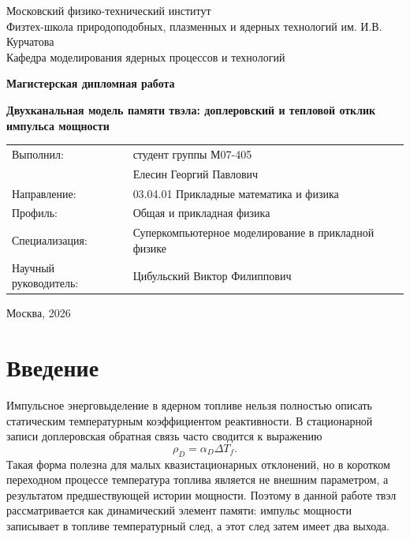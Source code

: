 \documentclass[12pt]{article}
\begin{document}
\begin{titlepage}
    \centering
    {\large Московский физико-технический институт\\[0.3cm]
    Физтех-школа природоподобных, плазменных и ядерных технологий им. И.В. Курчатова\\[0.3cm]
    Кафедра моделирования ядерных процессов и технологий\par}

    \vspace{2.5cm}

    {\Large\bfseries Магистерская дипломная работа\par}

    \vspace{1.5cm}

    {\LARGE\bfseries Двухканальная модель памяти твэла: доплеровский и тепловой отклик импульса мощности\par}

    \vspace{2.5cm}

    \begin{flushright}
        \begin{tabular}{>{\raggedleft\arraybackslash}p{5cm}p{7cm}}
            Выполнил: & студент группы М07-405\\
            & Елесин Георгий Павлович\\[0.4cm]
            Направление: & 03.04.01 Прикладные математика и физика\\[0.4cm]
            Профиль: & Общая и прикладная физика\\[0.4cm]
            Специализация: & Суперкомпьютерное моделирование в прикладной физике\\[0.4cm]
            Научный руководитель: & Цибульский Виктор Филиппович\\
        \end{tabular}
    \end{flushright}

    \vfill

    {Москва, 2026}
\end{titlepage}

\tableofcontents
\newpage

\section{Введение}

Импульсное энерговыделение в ядерном топливе нельзя полностью описать статическим температурным коэффициентом реактивности. В стационарной записи доплеровская обратная связь часто сводится к выражению
\[
\rho_D=\alpha_D\Delta T_f.
\]
Такая форма полезна для малых квазистационарных отклонений, но в коротком переходном процессе температура топлива является не внешним параметром, а результатом предшествующей истории мощности. Поэтому в данной работе твэл рассматривается как динамический элемент памяти: импульс мощности записывает в топливе температурный след, а этот след затем имеет два выхода.
\end{document}
